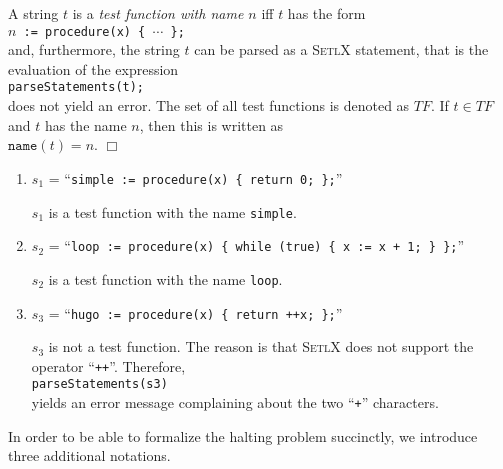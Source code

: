 \begin{Definition} 
A string $t$ is a \emph{test function with name $n$} iff $t$ has the form 
\\[0.2cm]
\hspace*{1.3cm} 
\texttt{$n$ := procedure(x) \{ $\cdots$ \};}
\\[0.2cm]
and, furthermore, the string $t$ can be parsed as a \textsc{SetlX} statement, that is the evaluation of
the expression
\\[0.2cm]
\hspace*{1.3cm}
\texttt{parseStatements(t);}
\\[0.2cm]
does not yield an error.  
The set of all test functions is denoted as $T\!F$.  If $t \in T\!F$ and $t$ has the name $n$, then
this is written as 
\\[0.2cm]
\hspace*{1.3cm}
$\mathtt{name}(t) = n$. \hspace*{\fill} $\Box$
\end{Definition}

\examples
\begin{enumerate}
\item $s_1$ = ``{\tt simple := procedure(x) \{ return 0; \};}''

      $s_1$ is a test function with the name \texttt{simple}.
\item $s_2$ = ``{\tt loop := procedure(x) \{ while (true) \{ x := x + 1; \} \};}''

      $s_2$ is a test function with the name \texttt{loop}. 
\item $s_3$ = ``{\tt hugo := procedure(x) \{ return ++x; \};}''

      $s_3$ is not a test function.  The reason is that \textsc{SetlX} does not support the operator
      ``\texttt{++}''.  Therefore, 
      \\[0.2cm]
      \hspace*{1.3cm}
      \texttt{parseStatements(s3)}
      \\[0.2cm]
      yields an error message complaining about the two ``\texttt{+}'' characters.
\end{enumerate}
In order to be able to formalize the halting problem succinctly, we introduce three additional
notations.

